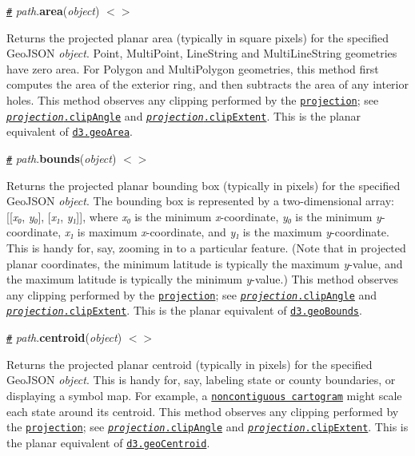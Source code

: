 \href{#path_area}{\tt \#} {\itshape path}.{\bfseries area}({\itshape object}) \href{https://github.com/d3/d3-geo/blob/master/src/path/area.js}{\tt $<$$>$}

Returns the projected planar area (typically in square pixels) for the specified Geo\+J\+S\+ON {\itshape object}. Point, Multi\+Point, Line\+String and Multi\+Line\+String geometries have zero area. For Polygon and Multi\+Polygon geometries, this method first computes the area of the exterior ring, and then subtracts the area of any interior holes. This method observes any clipping performed by the \href{#path_projection}{\tt projection}; see \href{#projection_clipAngle}{\tt {\itshape projection}.clip\+Angle} and \href{#projection_clipExtent}{\tt {\itshape projection}.clip\+Extent}. This is the planar equivalent of \href{#geoArea}{\tt d3.\+geo\+Area}.

\href{#path_bounds}{\tt \#} {\itshape path}.{\bfseries bounds}({\itshape object}) \href{https://github.com/d3/d3-geo/blob/master/src/path/bounds.js}{\tt $<$$>$}

Returns the projected planar bounding box (typically in pixels) for the specified Geo\+J\+S\+ON {\itshape object}. The bounding box is represented by a two-\/dimensional array\+: \mbox{[}\mbox{[}{\itshape x₀}, {\itshape y₀}\mbox{]}, \mbox{[}{\itshape x₁}, {\itshape y₁}\mbox{]}\mbox{]}, where {\itshape x₀} is the minimum {\itshape x}-\/coordinate, {\itshape y₀} is the minimum {\itshape y}-\/coordinate, {\itshape x₁} is maximum {\itshape x}-\/coordinate, and {\itshape y₁} is the maximum {\itshape y}-\/coordinate. This is handy for, say, zooming in to a particular feature. (Note that in projected planar coordinates, the minimum latitude is typically the maximum {\itshape y}-\/value, and the maximum latitude is typically the minimum {\itshape y}-\/value.) This method observes any clipping performed by the \href{#path_projection}{\tt projection}; see \href{#projection_clipAngle}{\tt {\itshape projection}.clip\+Angle} and \href{#projection_clipExtent}{\tt {\itshape projection}.clip\+Extent}. This is the planar equivalent of \href{#geoBounds}{\tt d3.\+geo\+Bounds}.

\href{#path_centroid}{\tt \#} {\itshape path}.{\bfseries centroid}({\itshape object}) \href{https://github.com/d3/d3-geo/blob/master/src/path/centroid.js}{\tt $<$$>$}

Returns the projected planar centroid (typically in pixels) for the specified Geo\+J\+S\+ON {\itshape object}. This is handy for, say, labeling state or county boundaries, or displaying a symbol map. For example, a \href{https://bl.ocks.org/mbostock/4055908}{\tt noncontiguous cartogram} might scale each state around its centroid. This method observes any clipping performed by the \href{#path_projection}{\tt projection}; see \href{#projection_clipAngle}{\tt {\itshape projection}.clip\+Angle} and \href{#projection_clipExtent}{\tt {\itshape projection}.clip\+Extent}. This is the planar equivalent of \href{#geoCentroid}{\tt d3.\+geo\+Centroid}.


